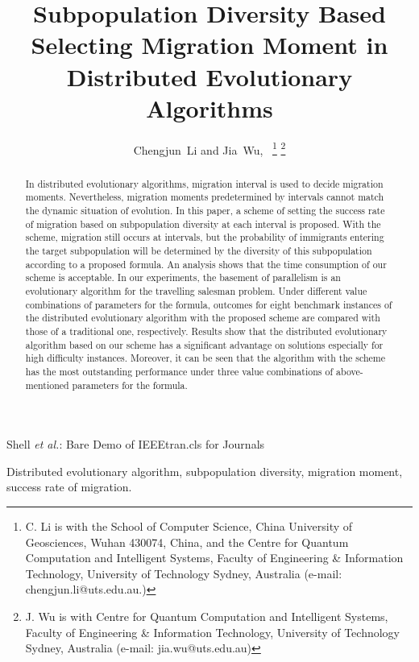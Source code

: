 \documentclass[journal,onecolumn]{IEEEtran}
\begin{document}
\title{Subpopulation Diversity Based Selecting Migration Moment in Distributed Evolutionary Algorithms}
\author{Chengjun~Li and Jia~Wu,~
\thanks{C. Li is with the School of Computer Science, China University of Geosciences, Wuhan 430074, China, and the Centre for Quantum Computation and Intelligent Systems, Faculty of Engineering \& Information Technology, University of Technology Sydney, Australia (e-mail: chengjun.li@uts.edu.au.)}
\thanks{J. Wu is with Centre for Quantum Computation and Intelligent Systems, Faculty of Engineering \& Information Technology, University of Technology Sydney, Australia (e-mail: jia.wu@uts.edu.au)}
}

\markboth{}%
{Shell \MakeLowercase{\textit{et al.}}: Bare Demo of IEEEtran.cls for Journals}
\maketitle
\begin{abstract}
In distributed evolutionary algorithms, migration interval is used to decide migration moments.
Nevertheless, migration moments predetermined by intervals cannot match the dynamic situation of evolution.
In this paper, a scheme of setting the success rate of migration based on subpopulation diversity at each interval is proposed.
With the scheme, migration still occurs at intervals, but the probability of immigrants entering the target subpopulation will be determined by the diversity of this subpopulation according to a proposed formula.
An analysis shows that the time consumption of our scheme is acceptable.
In our experiments, the basement of parallelism is an evolutionary algorithm for the travelling salesman problem.
Under different value combinations of parameters for the formula, outcomes for eight benchmark instances of the distributed evolutionary algorithm with the proposed scheme are compared with those of a traditional one, respectively.
Results show that the distributed evolutionary algorithm based on our scheme has a significant advantage on solutions especially for high difficulty instances.
Moreover, it can be seen that the algorithm with the scheme has the most outstanding performance under three value combinations of above-mentioned parameters for the formula.
\end{abstract}

\begin{IEEEkeywords}
Distributed evolutionary algorithm, subpopulation diversity, migration moment, success rate of migration.
\end{IEEEkeywords}
\IEEEpeerreviewmaketitle
\end{document}

